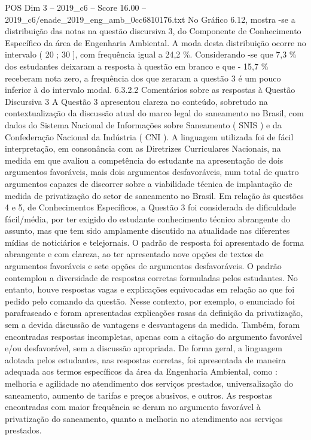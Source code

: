 \begin{textsample}{POS Dim 3 – 2019\_c6 – Score 16.00 – 2019\_c6/enade\_2019\_eng\_amb\_0cc6810176.txt}
No Gráfico 6.12, mostra -se a distribuição das notas na questão discursiva 3, do Componente de Conhecimento Específico da área de Engenharia Ambiental.
A moda desta distribuição ocorre no intervalo ( 20 ; 30 ], com frequência igual a 24,2 \%.
Considerando -se que 7,3 \% dos estudantes deixaram a resposta à questão em branco e que - 15,7 \% receberam nota zero, a frequência dos que zeraram a questão 3 é um pouco inferior à do intervalo modal. 6.3.2.2 Comentários sobre as respostas à Questão Discursiva 3 A Questão 3 apresentou clareza no conteúdo, sobretudo na contextualização da discussão atual do marco legal do saneamento no Brasil, com dados do Sistema Nacional de Informações sobre Saneamento ( SNIS ) e da Confederação Nacional da Indústria ( CNI ).
A linguagem utilizada foi de fácil interpretação, em consonância com as Diretrizes Curriculares Nacionais, na medida em que avaliou a competência do estudante na apresentação de dois argumentos favoráveis, mais dois argumentos desfavoráveis, num total de quatro argumentos capazes de discorrer sobre a viabilidade técnica de implantação de medida de privatização do setor de saneamento no Brasil.
Em relação às questões 4 e 5, de Conhecimentos Específicos, a Questão 3 foi considerada de dificuldade fácil/média, por ter exigido do estudante conhecimento técnico abrangente do assunto, mas que tem sido amplamente discutido na atualidade nas diferentes mídias de noticiários e telejornais.
O padrão de resposta foi apresentado de forma abrangente e com clareza, ao ter apresentado nove opções de textos de argumentos favoráveis e sete opções de argumentos desfavoráveis.
O padrão contemplou a diversidade de respostas corretas formuladas pelos estudantes.
No entanto, houve respostas vagas e explicações equivocadas em relação ao que foi pedido pelo comando da questão.
Nesse contexto, por exemplo, o enunciado foi parafraseado e foram apresentadas explicações rasas da definição da privatização, sem a devida discussão de vantagens e desvantagens da medida.
Também, foram encontradas respostas incompletas, apenas com a citação do argumento favorável e/ou desfavorável, sem a discussão apropriada.
De forma geral, a linguagem adotada pelos estudantes, nas respostas corretas, foi apresentada de maneira adequada aos termos específicos da área da Engenharia Ambiental, como : melhoria e agilidade no atendimento dos serviços prestados, universalização do saneamento, aumento de tarifas e preços abusivos, e outros.
As respostas encontradas com maior frequência se deram no argumento favorável à privatização do saneamento, quanto a melhoria no atendimento aos serviços prestados.

\end{textsample}
